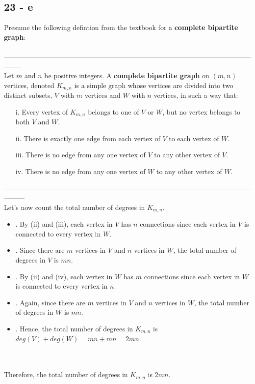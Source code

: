 \documentclass[12pt]{article}
\newcommand{\xlist}[1]{
    \begin{itemize}
        \renewcommand{\labelitemi}{$\centerdot$}
        #1
    \end{itemize}
    \newblock
}
\begin{document}
\subsection*{23 - e}
Presume the following defintion from the textbook for a \textbf{complete bipartite graph}:
\\ \\
-------------------------------------------------------------------------------------------------------------------- \\
Let $m$ and $n$ be positive integers. A \textbf{complete bipartite graph} on $(m, n)$ vertices, denoted $K_{m,n}$ is a simple graph whose vertices are divided into two distinct subsets, $V$ with $m$ vertices and $W$ with $n$ vertices, in such a way that:
\begin{itemize}
  \item [i.] Every vertex of $K_{m,n}$ belongs to one of $V$ or $W$, but no vertex belongs to both $V$ and $W$.
  \item [ii.] There is exactly one edge from each vertex of $V$ to each vertex of $W$.
  \item [iii.] There is no edge from any one vertex of $V$ to any other vertex of $V$.
  \item [iv.] There is no edge from any one vertex of $W$ to any other vertex of $W$.
\end{itemize}
\newblock
---------------------------------------------------------------------------------------------------------------------
\\
Let's now count the total number of degrees in $K_{m,n}$. 
\xlist{
  \item [.] By (ii) and (iii), each vertex in $V$ has $n$ connections since each vertex in $V$ is connected to every vertex in $W$.
  \item [.] Since there are $m$ vertices in $V$ and $n$ vertices in $W$, the total number of degrees in $V$ is $mn$.
  \item [.] By (ii) and (iv), each vertex in $W$ has $m$ connections since each vertex in $W$ is connected to every vertex in $n$.
  \item [.] Again, since there are $m$ vertices in $V$ and $n$ vertices in $W$, the total number of degrees in $W$ is $mn$.
  \item [.] Hence, the total number of degrees in $K_{m,n}$ is $deg(V) + deg(W) = mn+mn = 2mn$. 
}
\\ \\
Therefore, the total number of degrees in $K_{m,n}$ is $2mn$.
\end{document}

